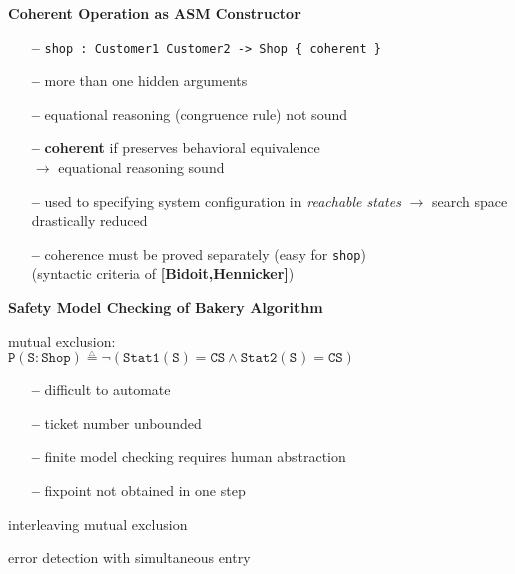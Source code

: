 \documentclass[landscape]{slides}
\def\DEF{\mathrel{\stackrel{_\triangle}{=}}}
\begin{document}
\begin{slide}\large\parskip=0pt
  \textbf{Coherent Operation as ASM Constructor}
  \begin{itemize}\itemsep=0pt
  \item[\bf --] \texttt{shop : Customer1 Customer2 -> Shop \{ coherent
      \}}
  \item[\bf --] more than one hidden arguments
  \item[\bf --] equational reasoning (congruence rule) not sound
  \item[\bf --] \textbf{coherent} if preserves behavioral equivalence\\
    $\rightarrow$ equational reasoning sound
  \item[\bf --] used to specifying system configuration in
    \emph{reachable states} $\rightarrow$ search space drastically
    reduced
  \item[\bf --] coherence must be proved separately (easy for \texttt{shop})\\
    (syntactic criteria of \textbf{[Bidoit,Hennicker]})
  \end{itemize}
  
\end{slide}

\begin{slide}\large\parskip=0pt
  \textbf{Safety Model Checking of Bakery Algorithm}

  \bigskip\bigskip

  mutual exclusion:\\
  $\mathtt{P(S:Shop)\DEF\neg(Stat1(S) = CS\wedge Stat2(S) = CS)}$

  \bigskip\bigskip

  \begin{itemize}\itemsep=0pt
  \item[\bf --] difficult to automate
  \item[\bf --] ticket number unbounded
  \item[\bf --] finite model checking requires human abstraction
  \item[\bf --] fixpoint not obtained in one step
  \end{itemize}
\end{slide}

\begin{slide}\large\parskip=0pt
  \vfil
  \begin{center}

    \bigskip

    interleaving mutual exclusion

    \bigskip

    error detection with simultaneous entry
  \end{center}
  \vfil
\end{slide}
\end{document}

